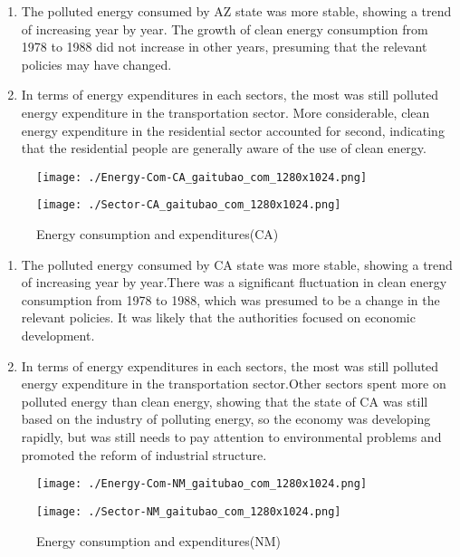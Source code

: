 \documentclass[a4paper]{article}
\begin{document}
\begin{enumerate}
\item The polluted energy consumed by AZ state was more stable, showing a trend of increasing year by year. The growth of clean energy consumption from 1978 to 1988 did not increase in other years, presuming that the relevant policies may have changed.

\item In terms of energy expenditures in each sectors, the most was still polluted energy expenditure in the transportation sector. More considerable, clean energy expenditure in the residential sector accounted for second,  indicating that the residential people are generally aware of the use of clean energy.
\end{enumerate}

\begin{figure}[H]
\begin{minipage}[t]{0.5\linewidth}
\centering
\texttt{[image: ./Energy-Com-CA\_gaitubao\_com\_1280x1024.png]}
\label{fig:side:a}
\end{minipage}%
\begin{minipage}[t]{0.5\linewidth}
\centering
\texttt{[image: ./Sector-CA\_gaitubao\_com\_1280x1024.png]}
\label{fig:side:b}
\end{minipage}
\caption{Energy consumption and expenditures(CA)}
\end{figure}

\begin{enumerate}
\item The polluted energy consumed by CA state was more stable, showing a trend of increasing year by year.There was a significant fluctuation in clean energy consumption from 1978 to 1988, which was presumed to be a change in the relevant policies. It was likely that the authorities focused on economic development.

\item In terms of energy expenditures in each sectors, the most was still polluted energy expenditure in the transportation sector.Other sectors spent more on polluted energy than clean energy, showing that the state of CA was still based on the industry of polluting energy, so the economy was developing rapidly, but was still needs to pay attention to environmental problems and promoted the reform of industrial structure.
\end{enumerate}


\begin{figure}[H]
\begin{minipage}[t]{0.5\linewidth}
\centering
\texttt{[image: ./Energy-Com-NM\_gaitubao\_com\_1280x1024.png]}
\label{fig:side:a}
\end{minipage}%
\begin{minipage}[t]{0.5\linewidth}
\centering
\texttt{[image: ./Sector-NM\_gaitubao\_com\_1280x1024.png]}
\label{fig:side:b}
\end{minipage}
\caption{Energy consumption and expenditures(NM)}
\end{figure}
\end{document}
